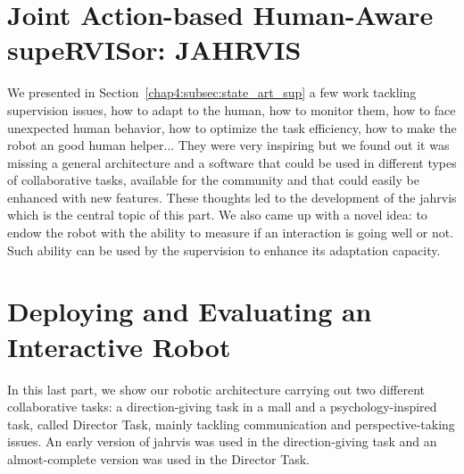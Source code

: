 \documentclass[english,a4paper,11pt,twoside]{StyleThese}
\begin{document}
\part{Joint Action-based Human-Aware supeRVISor: JAHRVIS}\label{part:part3}
\begin{partintro}
	We presented in Section~\ref{chap4:subsec:state_art_sup} a few work tackling supervision issues, \ie how to adapt to the human, how to monitor them, how to face unexpected human behavior, how to optimize the task efficiency, how to make the robot an good human helper... They were very inspiring but we found out it was missing a general architecture and a software that could be used in different types of collaborative tasks, available for the community and that could easily be enhanced with new features. These thoughts led to the development of the \acrfull{jahrvis} which is the central topic of this part. We also came up with a novel idea: to endow the robot with the ability to measure if an interaction is going well or not. Such ability can be used by the supervision to enhance its adaptation capacity.
\end{partintro}





\part{Deploying and Evaluating an Interactive Robot}\label{part:part4}
\begin{partintro}
	In this last part, we show our robotic architecture carrying out two different collaborative tasks: a direction-giving task in a mall and a psychology-inspired task, called Director Task, mainly tackling communication and perspective-taking issues. An early version of \acrshort{jahrvis} was used in the direction-giving task and an almost-complete version was used in the Director Task.
\end{partintro}	






\newpage
\listoftodos[Notes]


\appendix
{}
%




%


\cleardoublepage
\end{document}
